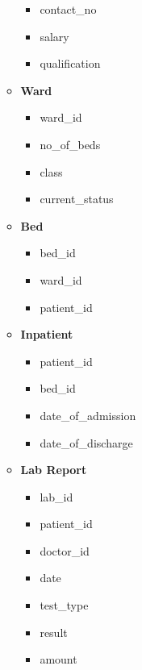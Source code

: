 \documentclass{article}
\begin{document}
\begin{itemize}
\begin{itemize}
\begin{itemize}
                    \item contact\_no
                    \item salary
                    \item qualification
                \end{itemize}
            \item \textbf{Ward}
                \begin{itemize}
                    \item {\color{blue}ward\_id}
                    \item no\_of\_beds
                    \item class
                    \item current\_status
                \end{itemize}
            \item \textbf{Bed}
                \begin{itemize}
                    \item {\color{blue}bed\_id}
                    \item {\color{red}ward\_id}
                    \item {\color{red}patient\_id}
                \end{itemize}
            \item \textbf{Inpatient}
                \begin{itemize}
                    \item {\color{blue}patient\_id}
                    \item {\color{red}bed\_id}
                    \item date\_of\_admission
                    \item date\_of\_discharge
                \end{itemize}
            \item \textbf{Lab Report}
                \begin{itemize}
                    \item {\color{blue}lab\_id}
                    \item {\color{red}patient\_id}
                    \item {\color{red}doctor\_id}
                    \item date
                    \item test\_type
                    \item result
                    \item amount

\end{itemize}
\end{itemize}
\end{itemize}
\end{document}
